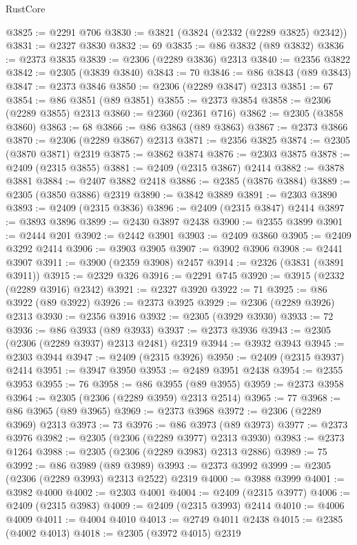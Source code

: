 \begin{lexlean}{RustCore}
\begin{coremodule}
@3825 := @2291 @706
@3830 := @3821 (@3824 (@2332 (@2289 @3825) @2342))
@3831 := @2327 @3830
@3832 := 69
@3835 := @86 @3832 (@89 @3832)
@3836 := @2373 @3835
@3839 := @2306 (@2289 @3836) @2313
@3840 := @2356 @3822
@3842 := @2305 (@3839 @3840)
@3843 := 70
@3846 := @86 @3843 (@89 @3843)
@3847 := @2373 @3846
@3850 := @2306 (@2289 @3847) @2313
@3851 := 67
@3854 := @86 @3851 (@89 @3851)
@3855 := @2373 @3854
@3858 := @2306 (@2289 @3855) @2313
@3860 := @2360 (@2361 @716)
@3862 := @2305 (@3858 @3860)
@3863 := 68
@3866 := @86 @3863 (@89 @3863)
@3867 := @2373 @3866
@3870 := @2306 (@2289 @3867) @2313
@3871 := @2356 @3825
@3874 := @2305 (@3870 @3871) @2319
@3875 := @3862 @3874
@3876 := @2303 @3875
@3878 := @2409 (@2315 @3855)
@3881 := @2409 (@2315 @3867) @2414
@3882 := @3878 @3881
@3884 := @2407 @3882 @2418
@3886 := @2385 (@3876 @3884)
@3889 := @2305 (@3850 @3886) @2319
@3890 := @3842 @3889
@3891 := @2303 @3890
@3893 := @2409 (@2315 @3836)
@3896 := @2409 (@2315 @3847) @2414
@3897 := @3893 @3896
@3899 := @2430 @3897 @2438
@3900 := @2355 @3899
@3901 := @2444 @201
@3902 := @2442 @3901
@3903 := @2409 @3860
@3905 := @2409 @3292 @2414
@3906 := @3903 @3905
@3907 := @3902 @3906
@3908 := @2441 @3907
@3911 := @3900 (@2359 @3908) @2457
@3914 := @2326 (@3831 (@3891 @3911))
@3915 := @2329 @326
@3916 := @2291 @745
@3920 := @3915 (@2332 (@2289 @3916) @2342)
@3921 := @2327 @3920
@3922 := 71
@3925 := @86 @3922 (@89 @3922)
@3926 := @2373 @3925
@3929 := @2306 (@2289 @3926) @2313
@3930 := @2356 @3916
@3932 := @2305 (@3929 @3930)
@3933 := 72
@3936 := @86 @3933 (@89 @3933)
@3937 := @2373 @3936
@3943 := @2305 (@2306 (@2289 @3937) @2313 @2481) @2319
@3944 := @3932 @3943
@3945 := @2303 @3944
@3947 := @2409 (@2315 @3926)
@3950 := @2409 (@2315 @3937) @2414
@3951 := @3947 @3950
@3953 := @2489 @3951 @2438
@3954 := @2355 @3953
@3955 := 76
@3958 := @86 @3955 (@89 @3955)
@3959 := @2373 @3958
@3964 := @2305 (@2306 (@2289 @3959) @2313 @2514)
@3965 := 77
@3968 := @86 @3965 (@89 @3965)
@3969 := @2373 @3968
@3972 := @2306 (@2289 @3969) @2313
@3973 := 73
@3976 := @86 @3973 (@89 @3973)
@3977 := @2373 @3976
@3982 := @2305 (@2306 (@2289 @3977) @2313 @3930)
@3983 := @2373 @1264
@3988 := @2305 (@2306 (@2289 @3983) @2313 @2886)
@3989 := 75
@3992 := @86 @3989 (@89 @3989)
@3993 := @2373 @3992
@3999 := @2305 (@2306 (@2289 @3993) @2313 @2522) @2319
@4000 := @3988 @3999
@4001 := @3982 @4000
@4002 := @2303 @4001
@4004 := @2409 (@2315 @3977)
@4006 := @2409 (@2315 @3983)
@4009 := @2409 (@2315 @3993) @2414
@4010 := @4006 @4009
@4011 := @4004 @4010
@4013 := @2749 @4011 @2438
@4015 := @2385 (@4002 @4013)
@4018 := @2305 (@3972 @4015) @2319

\end{coremodule}
\end{lexlean}
